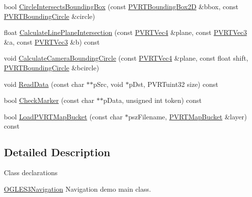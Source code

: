 \begin{DoxyCompactItemize}
\item 
bool \hyperlink{class_o_g_l_e_s3_navigation_aa82a6a031f064f6607f70c23762969fc}{Circle\+Intersects\+Bounding\+Box} (const \hyperlink{struct_p_v_r_t_bounding_box2_d}{P\+V\+R\+T\+Bounding\+Box2\+D} \&bbox, const \hyperlink{struct_p_v_r_t_bounding_circle}{P\+V\+R\+T\+Bounding\+Circle} \&circle)
\item 
float \hyperlink{class_o_g_l_e_s3_navigation_afa328dc5972ed69280a262c68c1803b2}{Calculate\+Line\+Plane\+Intersection} (const \hyperlink{struct_p_v_r_t_vec4}{P\+V\+R\+T\+Vec4} \&plane, const \hyperlink{struct_p_v_r_t_vec3}{P\+V\+R\+T\+Vec3} \&a, const \hyperlink{struct_p_v_r_t_vec3}{P\+V\+R\+T\+Vec3} \&b) const 
\item 
void \hyperlink{class_o_g_l_e_s3_navigation_af7e10b7b5702ebb311b1bc2504bf187e}{Calculate\+Camera\+Bounding\+Circle} (const \hyperlink{struct_p_v_r_t_vec4}{P\+V\+R\+T\+Vec4} \&plane, const float shift, \hyperlink{struct_p_v_r_t_bounding_circle}{P\+V\+R\+T\+Bounding\+Circle} \&bcircle)
\item 
void \hyperlink{class_o_g_l_e_s3_navigation_aa7c46273c4e5dbfe41b931599c405108}{Read\+Data} (const char $\ast$$\ast$p\+Src, void $\ast$p\+Dst, P\+V\+R\+Tuint32 size) const 
\item 
bool \hyperlink{class_o_g_l_e_s3_navigation_adcad6974998689d6aad23cb5831fe2a2}{Check\+Marker} (const char $\ast$$\ast$p\+Data, unsigned int token) const 
\item 
bool \hyperlink{class_o_g_l_e_s3_navigation_a21a322f2a42e5d10a788744332209782}{Load\+P\+V\+R\+T\+Map\+Bucket} (const char $\ast$psz\+Filename, \hyperlink{struct_p_v_r_t_map_bucket}{P\+V\+R\+T\+Map\+Bucket} \&layer) const 
\end{DoxyCompactItemize}


\subsection{Detailed Description}


 Class declarations



  \hyperlink{class_o_g_l_e_s3_navigation}{O\+G\+L\+E\+S3\+Navigation}  Navigation demo main class. 


